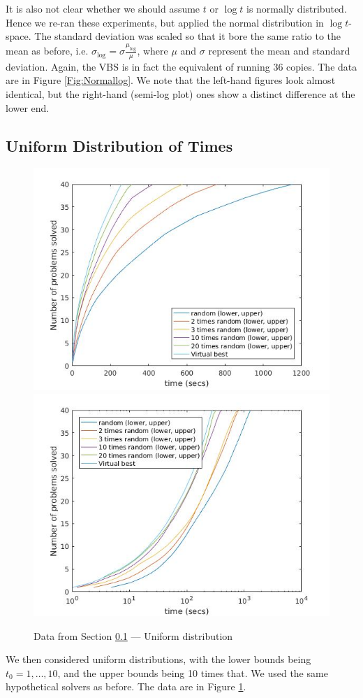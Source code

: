 \documentclass{easychair}
\begin{document}
It is also not clear whether we should assume $t$ or $\log t$ is normally distributed. Hence we re-ran these experiments, but applied the normal distribution in $\log t$-space. The standard deviation was scaled so that it bore the same ratio to the mean as before, i.e. $\sigma_{\log}=\sigma\frac{\mu_{\log}}\mu$, where $\mu$ and $\sigma$ represent the mean and standard deviation.
Again, the VBS is in fact the equivalent of running 36 copies.
The data are in Figure  \ref{Fig:Normallog}. We note that the left-hand figures look almost identical, but the right-hand (semi-log plot) ones show a distinct difference at the lower end.
\subsection{Uniform Distribution of Times}\label{sec:Uniform}
\begin{figure}[h]
\caption{Data from Section \ref{sec:Uniform} --- Uniform distribution\label{Fig:Uniform}}
\includegraphics[scale=0.4]{Runif20.jpg}
\includegraphics[scale=0.4]{Rlogunif20.jpg}
\end{figure}
We then considered uniform distributions, with the lower bounds being $t_0=1,\ldots,10$, and the upper bounds being 10 times that. We used the same hypothetical solvers as before.
The data are in Figure  \ref{Fig:Uniform}.
\end{document}
